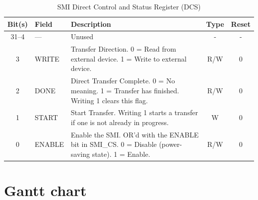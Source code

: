 \documentclass[final]{cmpreport}
\begin{document}
\begin{table}[h]
\centering
\label{tab:smi_dcs}
\begin{tabular}{|c|l|p{7cm}|c|c|}
\hline
\textbf{Bit(s)} & \textbf{Field} & \textbf{Description} & \textbf{Type} & \textbf{Reset} \\
\hline
31--4 & --- & Unused & - & - \\
\hline
3 & WRITE & Transfer Direction. 0 = Read from external device. 1 = Write to external device. & R/W & 0 \\
\hline
2 & DONE & Direct Transfer Complete. 0 = No meaning. 1 = Transfer has finished. Writing 1 clears this flag. & R/W & 0 \\
\hline
1 & START & Start Transfer. Writing 1 starts a transfer if one is not already in progress. & W & 0 \\
\hline
0 & ENABLE & Enable the SMI. OR'd with the ENABLE bit in SMI\_CS. 0 = Disable (power-saving state). 1 = Enable. & R/W & 0 \\
\hline
\end{tabular}
\caption{SMI Direct Control and Status Register (DCS)\label{dcs_register}}
\end{table}

\clearpage
\section{Gantt chart}\label{ApB}
\end{document}
